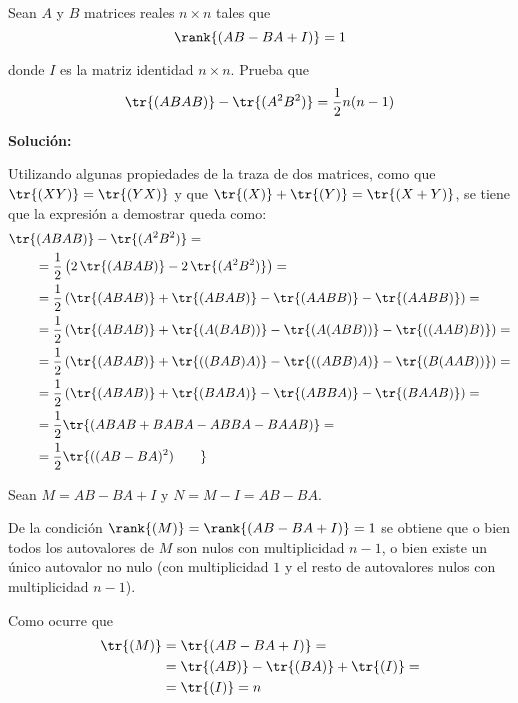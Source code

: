 \documentclass[../../main.tex]{subfiles}
\begin{document}
  \begin{shaded}
    Sean $A$ y $B$ matrices reales $n \times n$ tales que
    $$
    \rank{(AB - BA + I)} = 1
    $$

    donde $I$ es la matriz identidad $n \times n$. Prueba que
    $$
    \tr{(ABAB)} - \tr{(A^2 B^2)} = \frac{1}{2} n (n - 1)
    $$
  \end{shaded}

  \textbf{Solución:}

  Utilizando algunas propiedades de la traza de dos matrices, como que $\tr{(XY)} = \tr{(YX)}$ y que $\tr{(X)} + \tr{(Y)} = \tr{(X + Y)}$, se tiene que la expresión a demostrar queda como:
  \begin{equation*}
    \begin{split}
      &
      \tr{(ABAB)} - \tr{(A^2 B^2)} = \\ & \qquad =
      \frac{1}{2}\left(2 \, \tr{(ABAB)} - 2 \, \tr{(A^2 B^2)}\right) = \\ & \qquad =
      \frac{1}{2}\left(\tr{(ABAB)} + \tr{(ABAB)} - \tr{(AABB)} - \tr{(AABB)}\right) = \\ & \qquad =
      \frac{1}{2}\left(\tr{(ABAB)} + \tr{(A(BAB))} - \tr{(A(ABB))} - \tr{((AAB)B)}\right) = \\ & \qquad =
      \frac{1}{2}\left(\tr{(ABAB)} + \tr{((BAB)A)} - \tr{((ABB)A)} - \tr{(B(AAB))}\right) = \\ & \qquad =
      \frac{1}{2}\left(\tr{(ABAB)} + \tr{(BABA)} - \tr{(ABBA)} - \tr{(BAAB)}\right) = \\ & \qquad =
      \frac{1}{2}\tr{(ABAB + BABA - ABBA - BAAB)} = \\ & \qquad =
      \frac{1}{2}\tr{((AB - BA)^2)\qquad }
    \end{split}
  \end{equation*}

  Sean $M = AB - BA + I$ y $N = M - I = AB - BA$.

  De la condición $\rank{(M)} = \rank{(AB - BA + I)} = 1$ se obtiene que o bien todos los autovalores de $M$ son nulos con multiplicidad $n - 1$, o bien existe un único autovalor no nulo (con multiplicidad $1$ y el resto de autovalores nulos con multiplicidad $n - 1$).

  Como ocurre que
  \begin{equation*}
    \begin{split}
      \tr{(M)} & =
      \tr{(AB - BA + I)} = \\ & =
      \tr{(AB)} - \tr{(BA)} + \tr{(I)} = \\ & =
      \tr{(I)} = n
    \end{split}
  \end{equation*}
\end{document}
